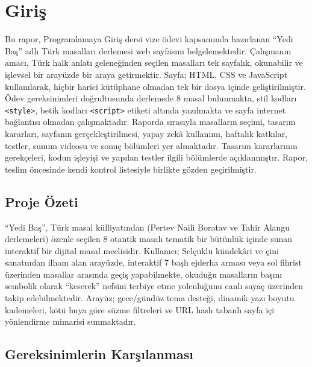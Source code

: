 \documentclass[11pt,a4paper]{article}
\begin{document}
\section{Giriş}

Bu rapor, Programlamaya Giriş dersi vize ödevi kapsamında hazırlanan ``Yedi Baş'' adlı Türk masalları derlemesi web sayfasını belgelemektedir. Çalışmanın amacı, Türk halk anlatı geleneğinden seçilen masalları tek sayfalık, okunabilir ve işlevsel bir arayüzde bir araya getirmektir. Sayfa; HTML, CSS ve JavaScript kullanılarak, hiçbir harici kütüphane olmadan tek bir dosya içinde geliştirilmiştir. Ödev gereksinimleri doğrultusunda derlemede 8 masal bulunmakta, stil kodları \texttt{<style>}, betik kodları \texttt{<script>} etiketi altında yazılmakta ve sayfa internet bağlantısı olmadan çalışmaktadır. Raporda sırasıyla masalların seçimi, tasarım kararları, sayfanın gerçekleştirilmesi, yapay zekâ kullanımı, haftalık katkılar, testler, sunum videosu ve sonuç bölümleri yer almaktadır. Tasarım kararlarının gerekçeleri, kodun işleyişi ve yapılan testler ilgili bölümlerde açıklanmıştır. Rapor, teslim öncesinde kendi kontrol listesiyle birlikte gözden geçirilmiştir.

\subsection{Proje Özeti}
``Yedi Baş'', Türk masal külliyatından (Pertev Naili Boratav ve Tahir Alangu derlemeleri) özenle seçilen 8 otantik masalı tematik bir bütünlük içinde sunan interaktif bir dijital masal meclisidir. Kullanıcı; Selçuklu kündekâri ve çini sanatından ilham alan arayüzde, interaktif 7 başlı ejderha arması veya sol fihrist üzerinden masallar arasında geçiş yapabilmekte, okuduğu masalların başını sembolik olarak ``keserek'' nefsini terbiye etme yolculuğunu canlı sayaç üzerinden takip edebilmektedir. Arayüz; gece/gündüz tema desteği, dinamik yazı boyutu kademeleri, kötü huya göre süzme filtreleri ve URL hash tabanlı sayfa içi yönlendirme mimarisi sunmaktadır.

\subsection{Gereksinimlerin Karşılanması}
\end{document}
